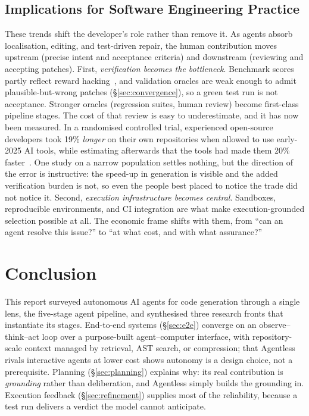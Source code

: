 \documentclass[
  english,        %
  font=times,     %
  twocolumn,      %
]{tumarticle}
\begin{document}
\subsection{Implications for Software Engineering Practice}
\label{sec:practice}
These trends shift the developer's role rather than remove it. As agents absorb
localisation, editing, and test-driven repair, the human contribution moves
upstream (precise intent and acceptance criteria) and downstream (reviewing and
accepting patches). First, \emph{verification becomes the bottleneck}. Benchmark
scores partly reflect reward hacking~\cite{cursor2025rewardhacking}, and
validation oracles are weak enough to admit plausible-but-wrong patches
(\S\ref{sec:convergence}), so a green test run is not acceptance. Stronger oracles
(regression suites, human review) become first-class pipeline stages. The cost of
that review is easy to underestimate, and it has now been measured. In a
randomised controlled trial, experienced open-source developers took 19\%
\emph{longer} on their own repositories when allowed to use early-2025 AI tools,
while estimating afterwards that the tools had made them 20\%
faster~\cite{metr2025rct}. One study on a narrow population settles nothing, but
the direction of the error is instructive: the speed-up in generation is visible
and the added verification burden is not, so even the people best placed to notice
the trade did not notice it. Second, \emph{execution infrastructure becomes
central}. Sandboxes, reproducible environments, and CI integration are what make
execution-grounded selection possible at all. The economic frame shifts with them,
from ``can an agent resolve this issue?'' to ``at what cost, and with what
assurance?''

\section{Conclusion}
This report surveyed autonomous AI agents for code generation through a single
lens, the five-stage agent pipeline, and synthesised three research fronts that
instantiate its stages. End-to-end systems (\S\ref{sec:e2e}) converge on an
observe--think--act loop over a purpose-built agent--computer interface, with
repository-scale context managed by retrieval, AST search, or compression; that
Agentless rivals interactive agents at lower cost shows autonomy is a design
choice, not a prerequisite. Planning (\S\ref{sec:planning}) explains why: its real
contribution is \emph{grounding} rather than deliberation, and Agentless simply
builds the grounding in. Execution feedback (\S\ref{sec:refinement}) supplies
most of the reliability, because a test run delivers a verdict the model cannot
anticipate.
\end{document}
